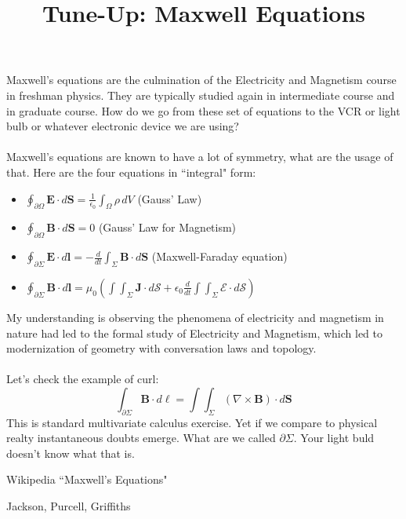 \documentclass[12pt]{article}
\title{Tune-Up: Maxwell Equations}
\date{}
\begin{document}
\sffamily

\maketitle

{\fontsize{16pt}{16pt}\selectfont 

\noindent  Maxwell's  equations are the culmination of the Electricity and Magnetism course in freshman physics.  They are typically studied again in intermediate course and in graduate course.  How do we go from these set of equations to the VCR or light bulb or whatever electronic device we are using?  \\ \\
Maxwell's equations are known to have a lot of symmetry, what are the usage of that.  Here are the four equations in ``integral" form:
\begin{itemize}
\item $\displaystyle \oint_{\partial \Omega} \mathbf{E}\cdot d\mathbf{S} = \frac{1}{\epsilon_0} \int_\Omega \rho \, dV $ (Gauss' Law)
\item $\displaystyle \oint_{\partial \Omega} \mathbf{B} \cdot d\mathbf{S} = 0 $ (Gauss' Law for Magnetism)
\item $\displaystyle \oint_{\partial \Sigma} \mathbf{E} \cdot d\mathbf{l} = - \frac{d}{dt} \int_\Sigma \mathbf{B} \cdot d \mathbf{S}$ (Maxwell-Faraday equation)
\item $\displaystyle \oint_{\partial \Sigma} \mathbf{B} \cdot d \mathbf{l} = 
\mu_0 \left( \int \int_\Sigma \mathbf{J} \cdot d\mathcal{S} + \epsilon_0 \frac{d}{dt} \int \int_{\Sigma} \mathcal{E} \cdot d\mathcal{S} \right) $
\end{itemize}
My understanding is observing the phenomena of electricity and magnetism in nature had led to the formal study of Electricity and Magnetism, which led to modernization of geometry with conversation laws and topology. \\ \\
Let's check the example of curl:
$$ \int_{\partial \Sigma} \mathbf{B} \cdot d\ell = \int \int_{\Sigma} (\nabla \times \mathbf{B}) \cdot d\mathbf{S} $$
This is standard multivariate calculus exercise.  Yet if we compare to physical realty instantaneous doubts emerge.  What are we called $\partial \Sigma$.  Your light buld doesn't know what that is.
}
\vfill

\begin{thebibliography}{}

\item Wikipedia ``Maxwell's Equations" 

\item Jackson, Purcell, Griffiths

\end{thebibliography}
\end{document}
